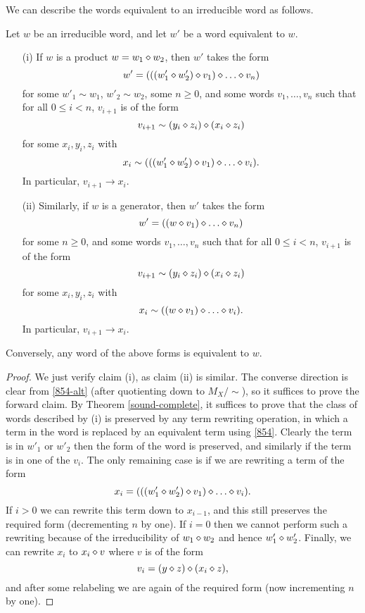We can describe the words equivalent to an irreducible word as follows.

\begin{theorem}\label{irred-desc}  Let $w$ be an irreducible word, and let $w'$ be a word equivalent to $w$.
  \begin{itemize}
    \item[(i)] If $w$ is a product $w = w_1 \diamond w_2$, then $w'$ takes the form
$$ w' = (((w'_1 \op w'_2) \op v_1) \op \dots \op v_n)$$
for some $w'_1 \sim w_1$, $w'_2 \sim w_2$, some $n \geq 0$, and some words $v_1, \dots, v_n$ such that for all $0 \leq i < n$, $v_{i+1}$ is of the form
$$ v_{i+1} \sim (y_i \diamond z_i) \diamond (x_i \diamond z_i)$$
for some $x_i, y_i, z_i$ with
$$ x_i \sim (((w'_1 \op w'_2) \op v_1) \op \dots \op v_i).$$
In particular, $v_{i+1} \to x_i$.
    \item[(ii)] Similarly, if $w$ is a generator, then $w'$ takes the form
$$ w' = ((w \op v_1) \op \dots \op v_n)$$
for some $n \geq 0$, and some words $v_1, \dots, v_n$ such that for all $0 \leq i < n$, $v_{i+1}$ is of the form
$$ v_{i+1} \sim (y_i \diamond z_i) \diamond (x_i \diamond z_i)$$
for some $x_i, y_i, z_i$ with
$$ x_i \sim ((w \op v_1) \op \dots \op v_i).$$
In particular, $v_{i+1} \to x_i$.
\end{itemize}
Conversely, any word of the above forms is equivalent to $w$.
\end{theorem}

\begin{proof}  We just verify claim (i), as claim (ii) is similar.  The converse direction is clear from \eqref{854-alt} (after quotienting down to $M_X/\sim$), so it suffices to prove the forward claim. By Theorem \ref{sound-complete}, it suffices to prove that the class of words described by (i) is preserved by any term rewriting operation, in which a term in the word is replaced by an equivalent term using \eqref{854}.  Clearly the term is in $w'_1$ or $w'_2$ then the form of the word is preserved, and similarly if the term is in one of the $v_i$.  The only remaining case is if we are rewriting a term of the form
$$ x_i = (((w'_1 \op w'_2) \op v_1) \op \dots \op v_i).$$
If $i>0$ we can rewrite this term down to $x_{i-1}$, and this still preserves the required form (decrementing $n$ by one).  If $i=0$ then we cannot perform such a rewriting because of the irreducibility of $w_1 \diamond w_2$ and hence $w'_1 \diamond w'_2$.  Finally, we can rewrite $x_i$ to $x_i \diamond v$ where $v$ is of the form
$$ v_i = (y \diamond z) \diamond (x_i \diamond z),$$
and after some relabeling we are again of the required form (now incrementing $n$ by one).
\end{proof}

